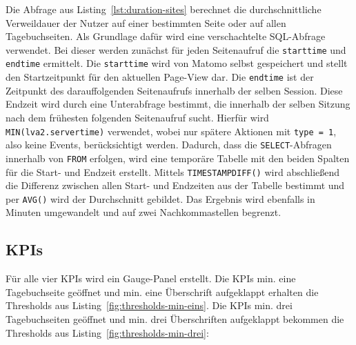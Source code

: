 \begin{figure}[H]
    \centering
    \begin{minipage}{\textwidth}
        
    \end{minipage}
\end{figure}

Die Abfrage aus Listing~\ref{lst:duration-sites} berechnet die durchschnittliche Verweildauer der Nutzer auf einer bestimmten Seite oder auf allen Tagebuchseiten. Als Grundlage dafür wird eine verschachtelte SQL-Abfrage verwendet. Bei dieser werden zunächst für jeden Seitenaufruf die \texttt{start\textunderscore time} und \texttt{end\textunderscore time} ermittelt. Die \texttt{start\textunderscore time} wird von Matomo selbst gespeichert und stellt den Startzeitpunkt für den aktuellen Page-View dar. Die \texttt{end\textunderscore time} ist der Zeitpunkt des darauffolgenden Seitenaufrufs innerhalb der selben Session. Diese Endzeit wird durch eine Unterabfrage bestimmt, die innerhalb der selben Sitzung nach dem frühesten folgenden Seitenaufruf sucht. Hierfür wird \texttt{MIN(lva2.server\textunderscore time)} verwendet, wobei nur spätere Aktionen mit \texttt{type = 1}, also keine Events, berücksichtigt werden. Dadurch, dass die \texttt{SELECT}-Abfragen innerhalb von \texttt{FROM} erfolgen, wird eine temporäre Tabelle mit den beiden Spalten für die Start- und Endzeit erstellt. Mittels \texttt{TIMESTAMPDIFF()} wird abschließend die Differenz zwischen allen Start- und Endzeiten aus der Tabelle bestimmt und per \texttt{AVG()} wird der Durchschnitt gebildet. Das Ergebnis wird ebenfalls in Minuten umgewandelt und auf zwei Nachkommastellen begrenzt.

\subsection{KPIs}
Für alle vier KPIs wird ein Gauge-Panel erstellt. Die KPIs \glqq min. eine Tagebuchseite geöffnet\grqq{} und \glqq min. eine Überschrift aufgeklappt\grqq{} erhalten die Thresholds aus Listing~\ref{fig:thresholds-min-eins}. Die KPIs \glqq min. drei Tagebuchseiten geöffnet\grqq{} und \glqq min. drei Überschriften aufgeklappt\grqq{} bekommen die Thresholds aus Listing~\ref{fig:thresholds-min-drei}: 

